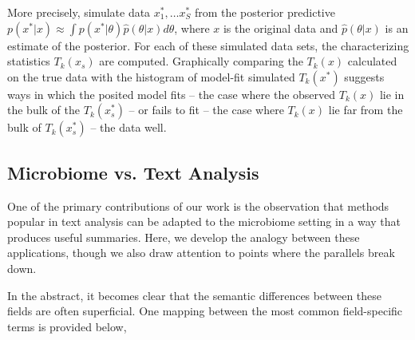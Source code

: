 \documentclass[oupdraft]{bio}
\begin{document}
More precisely, simulate data $x_{1}^{\ast}, \dots x_{S}^{\ast}$ from the
posterior predictive $p\left(x^{\ast}\vert x\right) \approx \int p\left(x^{\ast}
\vert \theta\right) \hat{p}\left(\theta \vert x \right)d\theta$, where $x$ is
the original data and $\hat{p}\left(\theta \vert x\right)$ is an estimate of the
posterior. For each of these simulated data sets, the characterizing statistics
$T_{k}\left(x_{s}\right)$ are computed. Graphically comparing the
$T_{k}\left(x\right)$ calculated on the true data with the histogram of
model-fit simulated $T_{k}\left(x^{\ast}\right)$ suggests ways in which the
posited model fits -- the case where the observed $T_{k}\left(x\right)$ lie in
the bulk of the $T_{k}\left(x^{\ast}_{s}\right)$ -- or fails to fit -- the case
where $T_{k}\left(x\right)$ lie far from the bulk of
$T_{k}\left(x^{\ast}_{s}\right)$ -- the data well.

\subsection{Microbiome vs. Text Analysis}
\label{sec:microbiome_vs_text_analysis}

One of the primary contributions of our work is the observation that methods
popular in text analysis can be adapted to the microbiome setting in a way that
produces useful summaries. Here, we develop the analogy between these
applications, though we also draw attention to points where the parallels break
down.

In the abstract, it becomes clear that the semantic differences between these
fields are often superficial. One mapping between the most common field-specific
terms is provided below,
\end{document}
